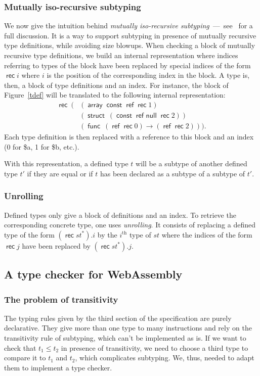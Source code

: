 \documentclass[a4paper,11pt]{article}
\DeclareMathOperator{\reft}{\textsf{ref}}
\DeclareMathOperator{\rect}{\textsf{rec}}
\DeclareMathOperator{\strt}{\textsf{struct}}
\DeclareMathOperator{\arrt}{\textsf{array}}
\DeclareMathOperator{\funt}{\textsf{func}}
\DeclareMathOperator{\cstt}{\textsf{const}}
\DeclareMathOperator{\refnullt}{\textsf{ref null}}
\begin{document}
\subsubsection{Mutually iso-recursive subtyping}\label{deft}
We now give the intuition behind \emph{mutually iso-recursive
subtyping}~---~see~\cite{rossberg2023mutually} for a full discussion. It is a
way to support subtyping in presence of mutually recursive type definitions,
while avoiding size blowups. When checking a block of mutually recursive type
definitions, we build an internal representation where indices referring to
types of the block have been replaced by special indices of the form $\rect i$
where $i$ is the position of the corresponding index in the block. A type is,
then, a block of type definitions and an index. For instance, the block of
Figure~\ref{tdef} will be translated to the following internal representation:
\begin{align*}
\rect\ (& (\arrt \cstt\reft \rect 1)\\
&(\strt\ (\cstt \refnullt \rect 2))\\
&(\funt\ (\reft \rect 0)\to (\reft \rect 2))).
\end{align*}
Each type definition is then replaced with a reference to this block and an
index (0 for \textsf{\$a}, 1 for \textsf{\$b}, etc.).

With this representation, a defined type $t$ will be a subtype of another
defined type $t'$ if they are equal or if $t$ has been declared as a subtype of
a subtype of $t'$.

\subsubsection{Unrolling}
Defined types only give a block of definitions and an index. To retrieve the
corresponding concrete type, one uses \emph{unrolling}. It consists of replacing
a defined type of the form $(\rect st^*).i$ by the $i^{\text{th}}$ type of $st$
where the indices of the form $\rect j$ have been replaced by $(\rect st^*).j$.

\subsection{A type checker for WebAssembly}
\subsubsection{The problem of transitivity}
The typing rules given by the third section of the specification are purely
declarative. They give more than one type to many instructions and rely on the
transitivity rule of subtyping, which can't be implemented as is. If we want to
check that $t_1 \leq t_2$ in presence of transitivity, we need to choose a third
type to compare it to $t_1$ and $t_2$, which complicates subtyping. We, thus,
needed to adapt them to implement a type checker.
\end{document}
